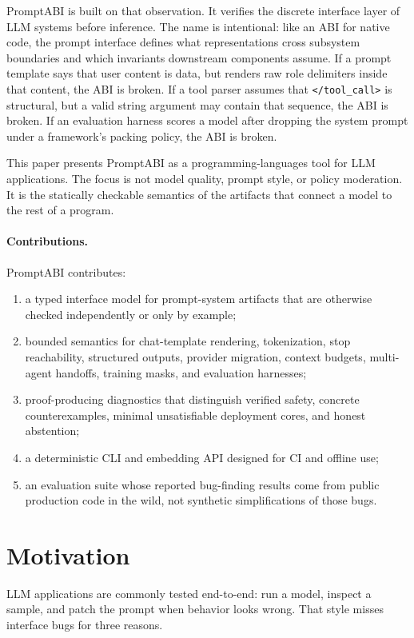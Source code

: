 \documentclass[10pt]{article}
\begin{document}
PromptABI is built on that observation. It verifies the discrete interface layer
of LLM systems before inference. The name is intentional: like an ABI for native
code, the prompt interface defines what representations cross subsystem
boundaries and which invariants downstream components assume. If a prompt
template says that user content is data, but renders raw role delimiters inside
that content, the ABI is broken. If a tool parser assumes that
\texttt{</tool\_call>} is structural, but a valid string argument may contain
that sequence, the ABI is broken. If an evaluation harness scores a model after
dropping the system prompt under a framework's packing policy, the ABI is
broken.

This paper presents PromptABI as a programming-languages tool for LLM
applications. The focus is not model quality, prompt style, or policy
moderation. It is the statically checkable semantics of the artifacts that
connect a model to the rest of a program.

\paragraph{Contributions.}
PromptABI contributes:
\begin{enumerate}
  \item a typed interface model for prompt-system artifacts that are otherwise
  checked independently or only by example;
  \item bounded semantics for chat-template rendering, tokenization, stop
  reachability, structured outputs, provider migration, context budgets,
  multi-agent handoffs, training masks, and evaluation harnesses;
  \item proof-producing diagnostics that distinguish verified safety,
  concrete counterexamples, minimal unsatisfiable deployment cores, and honest
  abstention;
  \item a deterministic CLI and embedding API designed for CI and offline use;
  \item an evaluation suite whose reported bug-finding results come from public
  production code in the wild, not synthetic simplifications of those bugs.
\end{enumerate}

\section{Motivation}

LLM applications are commonly tested end-to-end: run a model, inspect a sample,
and patch the prompt when behavior looks wrong. That style misses interface
bugs for three reasons.
\end{document}
